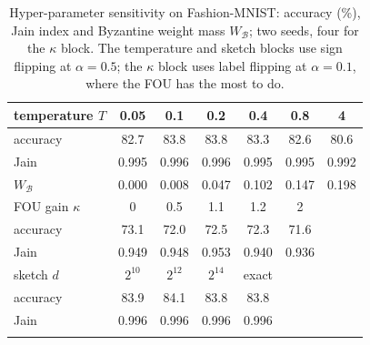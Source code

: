 \begin{table}[t]
\centering
\caption{Hyper-parameter sensitivity on Fashion-MNIST: accuracy (\%), Jain index and Byzantine weight mass $W_{\mathcal{B}}$; two seeds, four for the $\kappa$ block. The temperature and sketch blocks use sign flipping at $\alpha=0.5$; the $\kappa$ block uses label flipping at $\alpha=0.1$, where the FOU has the most to do.}
\label{tab:sens}
\setlength{\tabcolsep}{3.2pt}
\footnotesize
\begin{tabular}{lcccccc}
\toprule
temperature $T$ & 0.05 & 0.1 & 0.2 & 0.4 & 0.8 & 4\\
\midrule
accuracy & 82.7 & 83.8 & 83.8 & 83.3 & 82.6 & 80.6\\
Jain & 0.995 & 0.996 & 0.996 & 0.995 & 0.995 & 0.992\\
$W_{\mathcal{B}}$ & 0.000 & 0.008 & 0.047 & 0.102 & 0.147 & 0.198\\
\midrule
FOU gain $\kappa$ & 0 & 0.5 & 1.1 & 1.2 & 2 &\\
\midrule
accuracy & 73.1 & 72.0 & 72.5 & 72.3 & 71.6 &\\
Jain & 0.949 & 0.948 & 0.953 & 0.940 & 0.936 &\\
\midrule
sketch $d$ & $2^{10}$ & $2^{12}$ & $2^{14}$ & exact & &\\
\midrule
accuracy & 83.9 & 84.1 & 83.8 & 83.8 & &\\
Jain & 0.996 & 0.996 & 0.996 & 0.996 & &\\
\botrule
\end{tabular}
\end{table}
